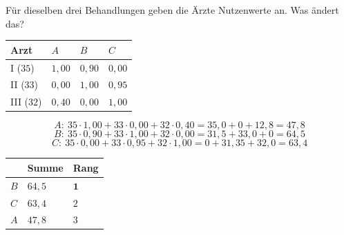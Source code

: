 \begin{aufgabe}
\begin{center}
\begin{minipage}{0.88\textwidth}
\end{minipage}
\end{center}
\end{aufgabe}

\begin{aufgabe}
Für dieselben drei Behandlungen geben die Ärzte Nutzenwerte an. Was ändert das?

\begin{center}
{\small
\renewcommand{\arraystretch}{1.48}
\begin{tabular}{@{}P{2.0cm}P{1.8cm}P{1.8cm}P{1.8cm}@{}}
\toprule
\textbf{Arzt} & $A$ & $B$ & $C$\\
\midrule
I ($35$) & $1{,}00$ & $0{,}90$ & $0{,}00$\\
II ($33$) & $0{,}00$ & $1{,}00$ & $0{,}95$\\
III ($32$) & $0{,}40$ & $0{,}00$ & $1{,}00$\\
\bottomrule
\end{tabular}}
\end{center}

\loesung
{}
\[ A: \ 35\cdot1{,}00 + 33\cdot0{,}00 + 32\cdot0{,}40 = 35{,}0 + 0 + 12{,}8 = 47{,}8 \]
\[ B: \ 35\cdot0{,}90 + 33\cdot1{,}00 + 32\cdot0{,}00 = 31{,}5 + 33{,}0 + 0 = 64{,}5 \]
\[ C: \ 35\cdot0{,}00 + 33\cdot0{,}95 + 32\cdot1{,}00 = 0 + 31{,}35 + 32{,}0 = 63{,}4 \]

\begin{center}
{\small
\renewcommand{\arraystretch}{1.48}
\begin{tabular}{@{}P{2.4cm}P{2.2cm}P{2.6cm}@{}}
\toprule
& \textbf{Summe} & \textbf{Rang}\\
\midrule
$B$ & $64{,}5$ & $\mathbf{1}$\\
$C$ & $63{,}4$ & $2$\\
$A$ & $47{,}8$ & $3$\\
\bottomrule
\end{tabular}}
\end{center}


\end{aufgabe}
